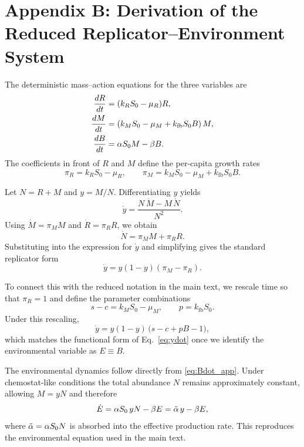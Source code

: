 \section*{Appendix B: Derivation of the Reduced Replicator–Environment System}

The deterministic mass–action equations for the three variables are
\begin{align}
\frac{dR}{dt} &= (k_R S_0 - \mu_R) R, \label{eq:Rdot_app} \\
\frac{dM}{dt} &= (k_M S_0 - \mu_M + k_{\mathrm{fb}} S_0 B)\, M, \label{eq:Mdot_app} \\
\frac{dB}{dt} &= \alpha S_0 M - \beta B. \label{eq:Bdot_app}
\end{align}
The coefficients in front of $R$ and $M$ define the per-capita growth rates
\[
\pi_R = k_R S_0 - \mu_R, \qquad
\pi_M = k_M S_0 - \mu_M + k_{\mathrm{fb}} S_0 B.
\]

Let $N = R + M$ and $y = M/N$. Differentiating $y$ yields
\[
\dot y = \frac{N\,\dot M - M\,\dot N}{N^2}.
\]
Using $\dot M = \pi_M M$ and $\dot R = \pi_R R$, we obtain
\[
\dot N = \pi_M M + \pi_R R.
\]
Substituting into the expression for $\dot y$ and simplifying gives the standard replicator form
\[
\dot y = y(1-y)(\pi_M - \pi_R).
\]

To connect this with the reduced notation in the main text, we rescale time so that $\pi_R = 1$ and define the parameter combinations
\[
s - c = k_M S_0 - \mu_M, \qquad
p = k_{\mathrm{fb}} S_0.
\]
Under this rescaling,
\[
\dot y = y(1-y)\,\bigl(s - c + pB - 1\bigr),
\]
which matches the functional form of Eq.~\eqref{eq:ydot} once we identify the environmental variable as $E \equiv B$.

The environmental dynamics follow directly from \eqref{eq:Bdot_app}. Under chemostat-like conditions the total abundance $N$ remains approximately constant, allowing $M = yN$ and therefore
\[
\dot E = \alpha S_0\, yN - \beta E = \tilde{\alpha}\,y - \beta E,
\]
where $\tilde{\alpha} = \alpha S_0 N$ is absorbed into the effective production rate. This reproduces the environmental equation used in the main text.